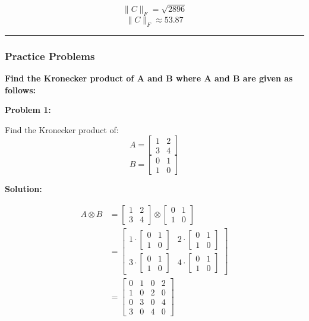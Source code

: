\documentclass[
  letterpaper,
  DIV=11,
  numbers=noendperiod]{scrreprt}
\theoremstyle{plain}
\theoremstyle{definition}
\theoremstyle{remark}
\begin{document}
\[\|C\|_F = \sqrt{2896}\] \[\|C\|_F \approx 53.87\]

\begin{center}\rule{0.5\linewidth}{0.5pt}\end{center}

\subsubsection*{Practice Problems}\label{practice-problems-3}

\textbf{Find the Kronecker product of A and B where A and B are given as
follows:}

\textbf{Problem 1:}

Find the Kronecker product of:
\[A=\begin{bmatrix}1&2\\3&4\end{bmatrix}\]
\[B=\begin{bmatrix}0&1\\1&0\end{bmatrix}\]

\textbf{Solution:}

\begin{align*}
A \otimes B &= \begin{bmatrix}1&2\\3&4\end{bmatrix} \otimes \begin{bmatrix}0&1\\1&0\end{bmatrix} \\
&= \begin{bmatrix}
1 \cdot \begin{bmatrix}0&1\\1&0\end{bmatrix} & 2 \cdot \begin{bmatrix}0&1\\1&0\end{bmatrix} \\
3 \cdot \begin{bmatrix}0&1\\1&0\end{bmatrix} & 4 \cdot \begin{bmatrix}0&1\\1&0\end{bmatrix}
\end{bmatrix} \\
&= \begin{bmatrix}
0 & 1 & 0 & 2 \\
1 & 0 & 2& 0\\
0 & 3 & 0 & 4 \\
3 & 0 & 4 & 0
\end{bmatrix}
\end{align*}
\end{document}
